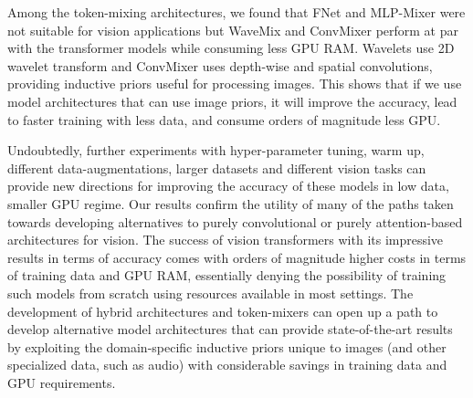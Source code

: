 \documentclass{article}
\begin{document}
Among the token-mixing architectures, we found that FNet and MLP-Mixer were not suitable for vision applications but WaveMix and ConvMixer perform at par with the transformer models while consuming less GPU RAM. Wavelets use 2D wavelet transform and ConvMixer uses depth-wise and spatial convolutions, providing inductive priors useful for processing images. This shows that if we use model architectures that can use image priors, it will improve the accuracy, lead to faster training with less data, and consume orders of magnitude less GPU.   

Undoubtedly, further experiments with hyper-parameter tuning, warm up, different data-augmentations, larger datasets and different vision tasks can provide new directions for improving the accuracy of these models in low data, smaller GPU regime. Our results confirm the utility of many of the paths taken towards developing alternatives to purely convolutional or purely attention-based architectures for vision. The success of vision transformers with its impressive results in terms of accuracy comes with orders of magnitude higher costs in terms of training data and GPU RAM, essentially denying the possibility of training such models from scratch using resources available in most settings. The development of hybrid architectures and token-mixers can open up a path to develop alternative model architectures that can provide state-of-the-art results by exploiting the domain-specific inductive priors unique to images (and other specialized data, such as audio) with considerable savings in training data and GPU requirements. 








  
\end{document}
